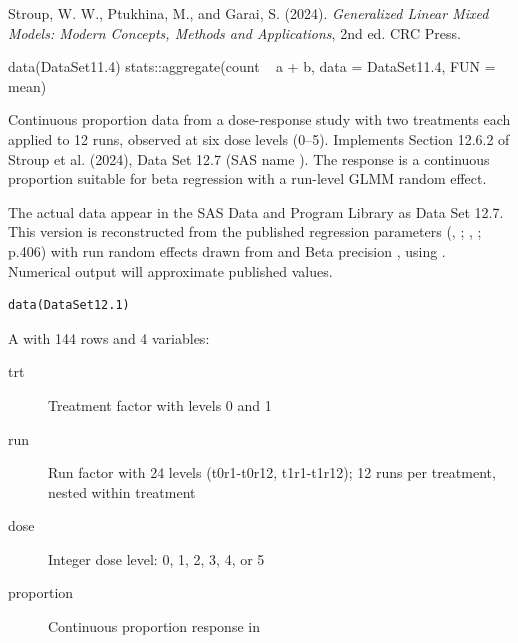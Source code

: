\documentclass[a4paper]{book}
\begin{document}
%
\begin{References}
Stroup, W. W., Ptukhina, M., and Garai, S. (2024).
\emph{Generalized Linear Mixed Models: Modern Concepts, Methods and
Applications}, 2nd ed. CRC Press.
\end{References}
%
\begin{SeeAlso}
\end{SeeAlso}
%
\begin{Examples}
\begin{ExampleCode}
data(DataSet11.4)
stats::aggregate(count ~ a + b, data = DataSet11.4, FUN = mean)
\end{ExampleCode}
\end{Examples}
%
\begin{Description}
Continuous proportion data from a dose-response study with two treatments
each applied to 12 runs, observed at six dose levels (0–5).  Implements
Section 12.6.2 of Stroup et al. (2024), Data Set 12.7 (SAS name
).  The response is a continuous proportion suitable for
beta regression with a run-level GLMM random effect.

 The actual data appear in the SAS Data and
Program Library as Data Set 12.7.  This version is reconstructed from the
published regression parameters (,
; ,
; p.406) with run random effects drawn from
 and Beta precision , using
.  Numerical output will approximate published values.
\end{Description}
%
\begin{Usage}
\begin{verbatim}
data(DataSet12.1)
\end{verbatim}
\end{Usage}
%
\begin{Format}
A  with 144 rows and 4 variables:
\begin{description}

\item[trt] Treatment factor with levels 0 and 1
\item[run] Run factor with 24 levels (t0r1-t0r12, t1r1-t1r12);
12 runs per treatment, nested within treatment
\item[dose] Integer dose level: 0, 1, 2, 3, 4, or 5
\item[proportion] Continuous proportion response in 

\end{description}

\end{Format}
\end{document}
